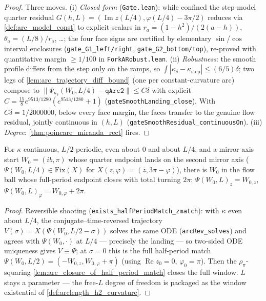 \begin{proof}
  \leanok
  Three moves. (i) \emph{Closed form} (\texttt{Gate.lean}): while confined the
  step-model quarter residual
  $G(h,L)=(\operatorname{Im}z(L/4),\varphi(L/4)-3\pi/2)$ reduces via
  \cref{def:arc_model_const} to explicit scalars in
  $r_a=(1-h^2)/(2(a-h))$, $\theta_a=(L/8)/r_a$, \dots; the four face signs are
  certified by elementary $\sin$/$\cos$ interval enclosures
  (\texttt{gate\_G1\_left/right}, \texttt{gate\_G2\_bottom/top}), re-proved
  with quantitative margin $\ge1/100$ in \texttt{ForkARobust.lean}. (ii)
  \emph{Robustness}: the smooth profile differs from the step only on the
  ramps, so $\int|\kappa_\delta-\kappa_{\mathrm{step}}|\le(6/5)\delta$; two
  legs of \cref{lem:arc_trajectory_diff_bound} (one per constant-curvature arc)
  compose to $\|\Psi_{\kappa_\delta}(W_0,L/4)-\texttt{qArc2}\|\le C\delta$ with
  explicit $C=\tfrac{15}{8}e^{9513/1280}(e^{9513/1280}+1)$
  (\texttt{gateSmoothLanding\_close}). With $C\delta=1/2000000$, below every
  face margin, the faces transfer to the genuine flow residual, jointly
  continuous in $(h,L)$ (\texttt{gateSmoothResidual\_continuousOn}). (iii)
  \emph{Degree}: \cref{thm:poincare_miranda_rect} fires.
\end{proof}

\begin{lemma}
  \label{lem:exists_closing_arc_state}
  For $\kappa$ continuous, $L/2$-periodic, even about $0$ and about $L/4$, and
  a mirror-axis start $W_0=(ib,\pi)$ whose quarter endpoint lands on the second
  mirror axis ($\Psi(W_0,L/4)\in\mathrm{Fix}(X)$ for
  $X(z,\varphi)=(\bar z,3\pi-\varphi)$), there is $W_0$ in the flow ball whose
  full-period endpoint closes with total turning $2\pi$:
  $\Psi(W_0,L)_z=W_{0,z}$, $\Psi(W_0,L)_\varphi=W_{0,\varphi}+2\pi$.
\end{lemma}

\begin{proof}
  \leanok
  Reversible shooting (\texttt{exists\_halfPeriodMatch\_zmatch}): with $\kappa$
  even about $L/4$, the conjugate--time-reversed trajectory
  $V(\sigma)=X(\Psi(W_0,L/2-\sigma))$ solves the same ODE
  (\texttt{arcRev\_solves}) and agrees with $\Psi(W_0,\cdot)$ at $L/4$ —
  precisely the landing — so two-sided ODE uniqueness gives $V\equiv\Psi$;
  at $\sigma=0$ this is the full half-period match
  $\Psi(W_0,L/2)=(-W_{0,z},W_{0,\varphi}+\pi)$ (using
  $\operatorname{Re}z_0=0$, $\varphi_0=\pi$). Then the $\rho_\pi$-squaring
  \cref{lem:arc_closure_of_half_period_match} closes the full window. $L$
  stays a parameter — the free-$L$ degree of freedom is packaged as the window
  existential of \cref{def:arclength_h2_curvature}.
\end{proof}


